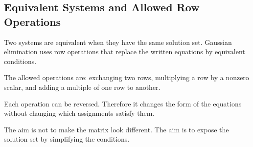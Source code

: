 \subsection{Equivalent Systems and Allowed Row Operations}

Two systems are equivalent when they have the same solution set. Gaussian elimination uses row operations that replace the written equations by equivalent conditions.

\begin{definitionbox}
The allowed operations are: exchanging two rows, multiplying a row by a nonzero scalar, and adding a multiple of one row to another.
\end{definitionbox}

\begin{interpretationbox}
Each operation can be reversed. Therefore it changes the form of the equations without changing which assignments satisfy them.
\end{interpretationbox}

\begin{remarkbox}
The aim is not to make the matrix look different. The aim is to expose the solution set by simplifying the conditions.
\end{remarkbox}
